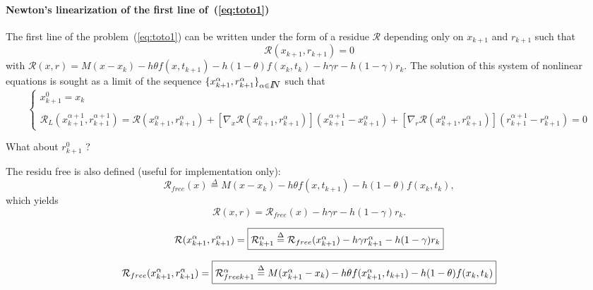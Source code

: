  \paragraph{Newton's linearization of the first line of~(\ref{eq:toto1})} The first line of the  problem~(\ref{eq:toto1}) can be written under the form of a residue $\mathcal R$ depending only on $x_{k+1}$ and $r_{k+1}$ such that 
\begin{equation}
  \label{eq:NL3}
  \mathcal R (x_{k+1},r _{k+1}) =0
\end{equation}
with $\mathcal R(x,r) = M(x - x_{k}) -h\theta f( x , t_{k+1}) - h(1-\theta)f(x_k,t_k) - h\gamma r
- h(1-\gamma)r_k$.
The solution of this system of nonlinear equations is sought as a limit of the sequence $\{ x^{\alpha}_{k+1},r^{\alpha}_{k+1} \}_{\alpha \in \mbox{\rm $I\!\!N$}}$ such that
 \begin{equation}
   \label{eq:NL7}
   \begin{cases}
     x^{0}_{k+1} = x_k \\ \\
     \mathcal R_L( x^{\alpha+1}_{k+1},r^{\alpha+1}_{k+1}) = \mathcal
     R(x^{\alpha}_{k+1},r^{\alpha}_{k+1})  + \left[ \nabla_{x} \mathcal
     R(x^{\alpha}_{k+1},r^{\alpha}_{k+1})\right] (x^{\alpha+1}_{k+1}-x^{\alpha}_{k+1} ) +
     \left[ \nabla_{r} \mathcal R(x^{\alpha}_{k+1},r^{\alpha}_{k+1})\right] (r^{\alpha+1}_{k+1} - r^{\alpha}_{k+1} ) =0
 \end{cases}
\end{equation}
\begin{ndrva}
  What about $r^0_{k+1}$ ?
\end{ndrva}

The residu free is also defined (useful for implementation only):
\[\mathcal R _{free}(x) \stackrel{\Delta}{=}  M(x - x_{k}) -h\theta f( x , t_{k+1}) - h(1-\theta)f(x_k,t_k),\]
which yields
\[\mathcal R (x,r) = \mathcal R _{free}(x)   - h\gamma r - h(1-\gamma)r_k.\]

\begin{equation}
  \mathcal R (x^{\alpha}_{k+1},r^{\alpha}_{k+1}) = \fbox{$\mathcal R^{\alpha}_{k+1} \stackrel{\Delta}{=}  \mathcal R
_{free}(x^{\alpha}_{k+1})  - h\gamma r^{\alpha}_{k+1} - h(1-\gamma)r_k$}\label{eq:rfree-1}
\end{equation}

\[  \mathcal R
_{free}(x^{\alpha}_{k+1},r^{\alpha}_{k+1} )=\fbox{$ \mathcal R _{free k+1} ^{\alpha} \stackrel{\Delta}{=}  M(x^{\alpha}_{k+1} - x_{k}) -h\theta f( x^{\alpha}_{k+1} , t_{k+1}) - h(1-\theta)f(x_k,t_k)$}\]
 
